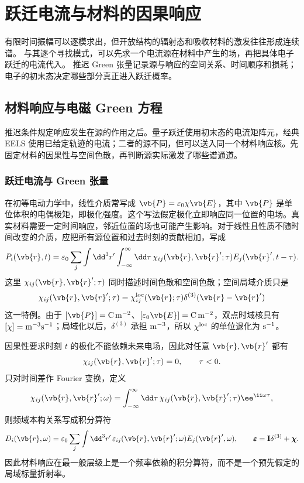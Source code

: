 \chapter{跃迁电流与材料的因果响应}\label{chap:electron-current-response}

有限时间振幅可以逐模求出，但开放结构的辐射态和吸收材料的激发往往形成连续谱。
与其逐个寻找模式，可以先求一个电流源在材料中产生的场，再把具体电子跃迁的电流代入。
推迟 Green 张量记录源与响应的空间关系、时间顺序和损耗；电子的初末态决定哪些部分真正进入跃迁概率。

\section{材料响应与电磁 Green 方程}

推迟条件规定响应发生在源的作用之后。量子跃迁使用初末态的电流矩阵元，经典 EELS 使用已给定轨迹的电流；二者的源不同，但可以送入同一个材料响应核。先固定材料的因果性与空间色散，再判断源实际激发了哪些谱通道。

\subsection{跃迁电流与 Green 张量}

在初等电动力学中，线性介质常写成 $\vb{P}=\varepsilon_0\chi\vb{E}$，其中 $\vb{P}$ 是单位体积的电偶极矩，即极化强度。这个写法假定极化立即响应同一位置的电场。真实材料需要一定时间响应，邻近位置的场也可能产生影响。对于线性且性质不随时间改变的介质，应把所有源位置和过去时刻的贡献相加，写成
\begin{equation}
{
P_i(\vb{r},t)
=\varepsilon_0\sum_j
\int\dd^3r'\int_{-\infty}^{\infty}\dd\tau\,
\chi_{ij}(\vb{r},\vb{r}';\tau)
E_j(\vb{r}',t-\tau).}
\label{eq:general_nonlocal_causal_susceptibility}
\end{equation}
这里 $\chi_{ij}(\vb{r},\vb{r}';\tau)$ 同时描述时间色散和空间色散；空间局域介质只是
\[
\chi_{ij}(\vb{r},\vb{r}';\tau)
=\chi_{ij}^{\rm loc}(\vb{r};\tau)
\delta^{(3)}(\vb{r}-\vb{r}')
\]
这一特例。由于 $[\vb{P}]={\rm C\,m^{-2}}$、$[\varepsilon_0\vb{E}]={\rm C\,m^{-2}}$，双点时域核具有 $[\chi]={\rm m^{-3}s^{-1}}$；局域化以后，$\delta^{(3)}$ 承担 ${\rm m^{-3}}$，所以 $\chi^{\rm loc}$ 的单位退化为 ${\rm s^{-1}}$。

因果性要求时刻 $t$ 的极化不能依赖未来电场，因此对任意 $\vb{r},\vb{r}'$ 都有
\begin{equation}
{
\chi_{ij}(\vb{r},\vb{r}';\tau)=0,
\qquad \tau<0.}
\label{eq:causal_material_response_support}
\end{equation}
只对时间差作 Fourier 变换，定义
\[
\chi_{ij}(\vb{r},\vb{r}';\omega)
=\int_{-\infty}^{\infty}\dd\tau\,
\chi_{ij}(\vb{r},\vb{r}';\tau)\ee^{\ii\omega\tau},
\]
则频域本构关系写成积分算符
\begin{equation}
{
D_i(\vb{r},\omega)
=\varepsilon_0\sum_j\int\dd^3r'\,
\varepsilon_{ij}(\vb{r},\vb{r}';\omega)
E_j(\vb{r}',\omega),
\qquad
\boldsymbol\varepsilon=\mathbf I\delta^{(3)}+\boldsymbol\chi.}
\label{eq:nonlocal_permittivity_kernel}
\end{equation}
因此材料响应在最一般层级上是一个频率依赖的积分算符，而不是一个预先假定的局域标量折射率。

